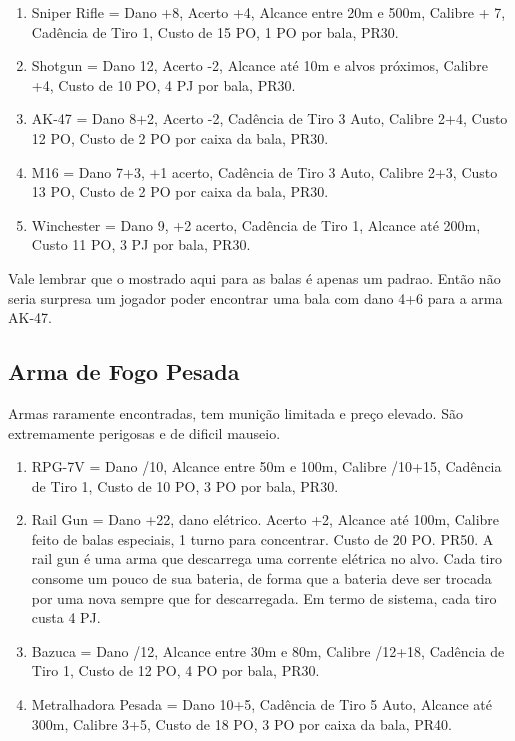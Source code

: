 \begin{enumerate}
	\item Sniper Rifle = Dano +8, Acerto +4, Alcance entre 20m e 500m, Calibre + 7, Cadência de Tiro 1, Custo de 15 PO, 1 PO por bala, PR30.
	\item Shotgun = Dano 12, Acerto -2, Alcance até 10m e alvos próximos, Calibre +4, Custo de 10 PO, 4 PJ por bala, PR30. 
	\item AK-47 = Dano 8+2, Acerto -2, Cadência de Tiro 3 Auto, Calibre 2+4, Custo 12 PO, Custo de 2 PO por caixa da bala, PR30. 
	\item M16 = Dano 7+3, +1 acerto, Cadência de Tiro 3 Auto, Calibre 2+3, Custo 13 PO, Custo de 2 PO por caixa da bala, PR30.
	\item Winchester = Dano 9, +2 acerto, Cadência de Tiro 1, Alcance até 200m, Custo 11 PO, 3 PJ por bala, PR30.
\end{enumerate}

Vale lembrar que o mostrado aqui para as balas é apenas um padrao. Então não seria surpresa um jogador poder encontrar uma bala com dano 4+6 para a arma AK-47.

\subsection{Arma de Fogo Pesada}
Armas raramente encontradas, tem munição limitada e preço elevado. São extremamente perigosas e de dificil  mauseio.

\begin{enumerate}
	\item RPG-7V = Dano /10, Alcance entre 50m e 100m, Calibre /10+15, Cadência de Tiro 1, Custo de 10 PO, 3 PO por bala, PR30.
	\item Rail Gun = Dano +22, dano elétrico. Acerto +2, Alcance até 100m, Calibre feito de balas especiais, 1 turno para concentrar. Custo de 20 PO. PR50. A rail gun é uma arma que descarrega uma corrente elétrica no alvo. Cada tiro consome um pouco de sua bateria, de forma que a bateria deve ser trocada por uma nova sempre que for descarregada. Em termo de sistema, cada tiro custa 4 PJ.	
	\item Bazuca = Dano /12, Alcance entre 30m e 80m, Calibre /12+18, Cadência de Tiro 1, Custo de 12 PO, 4 PO por bala, PR30.
	\item Metralhadora Pesada = Dano 10+5, Cadência de Tiro 5 Auto, Alcance até 300m, Calibre 3+5, Custo de 18 PO, 3 PO por caixa da bala, PR40.
\end{enumerate}


